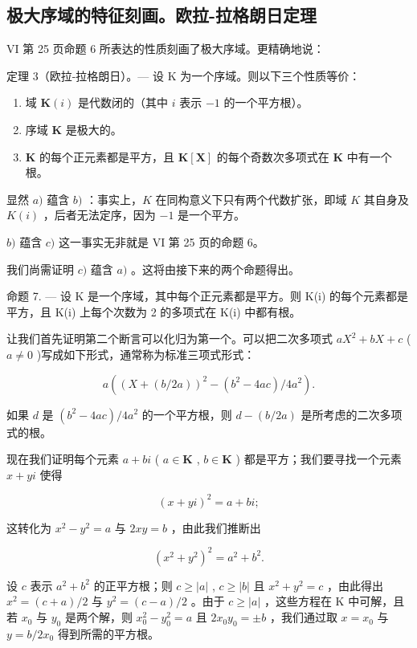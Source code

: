 \subsection{极大序域的特征刻画。欧拉-拉格朗日定理}

VI 第 25 页命题 6 所表达的性质刻画了极大序域。更精确地说：

定理 3（欧拉-拉格朗日）。--- 设 K 为一个序域。则以下三个性质等价：

\begin{enumerate}
\def\labelenumi{\alph{enumi})}
\item
  域 \(\mathbf{K}(i)\) 是代数闭的（其中 \(i\) 表示 \(-1\) 的一个平方根）。
\item
  序域 \(\mathbf{K}\) 是极大的。
\item
  \(\mathbf{K}\) 的每个正元素都是平方，且 \(\mathbf{K}[\mathbf{X}]\) 的每个奇数次多项式在 \(\mathbf{K}\) 中有一个根。
\end{enumerate}

显然 \(a)\) 蕴含 \(b)\) ：事实上，\(K\) 在同构意义下只有两个代数扩张，即域 \(K\) 其自身及 \(K(i)\) ，后者无法定序，因为 \(-1\) 是一个平方。

\(b)\) 蕴含 \(c)\) 这一事实无非就是 VI 第 25 页的命题 6。

我们尚需证明 \(c)\) 蕴含 \(a)\) 。这将由接下来的两个命题得出。

命题 7. --- 设 K 是一个序域，其中每个正元素都是平方。则 K(i) 的每个元素都是平方，且 K(i) 上每个次数为 2 的多项式在 K(i) 中都有根。

让我们首先证明第二个断言可以化归为第一个。可以把二次多项式 \(aX^{2} + bX + c\) ( \(a \neq 0\) )写成如下形式，通常称为标准三项式形式：

\[
a \left(\left(X + (b / 2 a)\right) ^ {2} - \left(b ^ {2} - 4 a c\right) / 4 a ^ {2}\right).
\]

如果 \(d\) 是 \((b^2 - 4ac) / 4a^2\) 的一个平方根，则 \(d - (b / 2a)\) 是所考虑的二次多项式的根。

现在我们证明每个元素 \(a + bi\) ( \(a \in \mathbf{K}\) , \(b \in \mathbf{K}\) ) 都是平方；我们要寻找一个元素 \(x + yi\) 使得

\[
(x + y i) ^ {2} = a + b i;
\]

这转化为 \(x^{2} - y^{2} = a\) 与 \(2xy = b\) ，由此我们推断出

\[
(x ^ {2} + y ^ {2}) ^ {2} = a ^ {2} + b ^ {2}.
\]

设 \(c\) 表示 \(a^2 + b^2\) 的正平方根；则 \(c \geqslant |a|\) , \(c \geqslant |b|\) 且 \(x^2 + y^2 = c\) ，由此得出 \(x^2 = (c + a)/2\) 与 \(y^2 = (c - a)/2\) 。由于 \(c \geqslant |a|\) ，这些方程在 K 中可解，且若 \(x_0\) 与 \(y_0\) 是两个解，则 \(x_0^2 - y_0^2 = a\) 且 \(2x_0y_0 = \pm b\) ，我们通过取 \(x = x_0\) 与 \(y = b/2x_0\) 得到所需的平方根。

